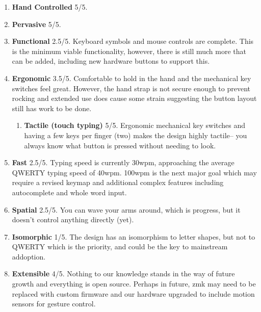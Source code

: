 \documentclass[logo,bsc,singlespacing,parskip]{infthesis}
\begin{document}
\begin{enumerate}
\item \textbf{Hand Controlled} 5/5.

\item \textbf{Pervasive} 5/5.

\item \textbf{Functional} 2.5/5. Keyboard symbols and mouse controls are complete.
This is the minimum viable functionality, however, there is still much more that can be added, including new hardware buttons to support this. \smallskip

\item \textbf{Ergonomic} 3.5/5. Comfortable to hold in the hand and the mechanical key switches feel great.
However, the hand strap is not secure enough to prevent rocking and extended use does cause some strain suggesting the button layout still has work to be done. \smallskip

\begin{enumerate}
\item \textbf{Tactile (touch typing)}  5/5. Ergonomic mechanical key switches and having a few keys per finger (two) makes the design highly tactile-- you always know what button is pressed without needing to look. \smallskip
\end{enumerate}

\item \textbf{Fast} 2.5/5. Typing speed is currently 30wpm, approaching the average QWERTY typing speed of 40wpm.
100wpm is the next major goal which may require a revised keymap and additional complex features including autocomplete and whole word input. \smallskip

\item \textbf{Spatial} 2.5/5. You can wave your arms around, which is progress, but it doesn't control anything directly (yet). \smallskip

\item \textbf{Isomorphic} 1/5. The design has an isomorphism to letter shapes, but not to QWERTY which is the priority, and could be the key to mainstream addoption. \smallskip

\item \textbf{Extensible} 4/5. Nothing to our knowledge stands in the way of future growth and everything is open source.
Perhaps in future, zmk \autocite{ZMKFirmware} may need to be replaced with custom firmware and our hardware upgraded to include motion sensors for gesture control. \smallskip
\end{enumerate}
\end{document}
